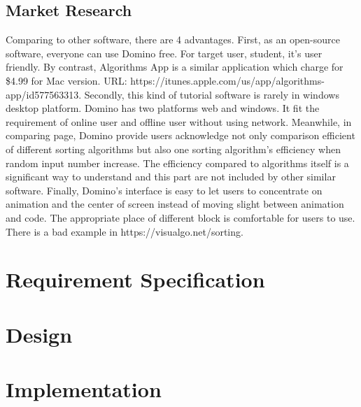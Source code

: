 \documentclass[paper=a4, fontsize=11pt,twoside]{scrartcl}		%
\begin{document}
\subsection{Market Research}
Comparing to other software, there are 4 advantages. First, as an open-source software, everyone can use Domino free. For target user, student, it’s user friendly. By contrast, Algorithms App is a similar application which charge for \$4.99 for Mac version. URL: https://itunes.apple.com/us/app/algorithms-app/id577563313. Secondly, this kind of tutorial software is rarely in windows desktop platform. Domino has two platforms web and windows. It fit the requirement of online user and offline user without using network. Meanwhile, in comparing page, Domino provide users acknowledge not only comparison efficient of different sorting algorithms but also one sorting algorithm’s efficiency when random input number increase. The efficiency compared to algorithms itself is a significant way to understand and this part are not included by other similar software. Finally, Domino’s interface is easy to let users to concentrate on animation and the center of screen instead of moving slight between animation and code. The appropriate place of different block is comfortable for users to use. There is a bad example in https://visualgo.net/sorting.

\section{Requirement Specification}
\clearpage

\section{Design}

\clearpage
\section{Implementation}
\end{document}

